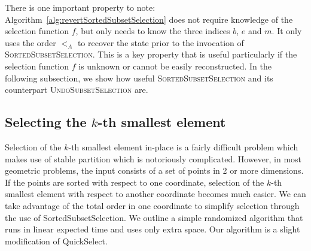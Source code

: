 There is one important property to note:
Algorithm~\ref{alg:revertSortedSubsetSelection} does not require
knowledge of the selection function $f$, but only needs to know the
three indices $b$, $e$ and $m$. It only uses the order $<_{A}$ to
recover the state prior to the invocation of
\textsc{SortedSubsetSelection}. This is a key property that is useful
particularly if the selection function $f$ is unknown or cannot be
easily reconstructed.  In the following subsection, we show how useful
\textsc{SortedSubsetSelection} and its counterpart
\textsc{UndoSubsetSelection} are.


\subsection{Selecting the $k$-th smallest element}\label{sec:sel}

Selection of the $k$-th smallest element in-place is a fairly
difficult problem which makes use of stable partition which is
notoriously complicated\cite{kata:select}. However, in most geometric problems,
the input consists of a set of points in 2 or more dimensions.  If
the points are sorted with respect to one coordinate, selection of
the $k$-th smallest element with respect to another coordinate
becomes much easier.  We can take advantage of the total order in
one coordinate to simplify selection through the use of
SortedSubsetSelection. We outline a simple randomized algorithm
that runs in linear expected time and uses only  extra space.
Our algorithm is a slight modification of QuickSelect\cite{hoare:quicksort, cormen:alg}.



